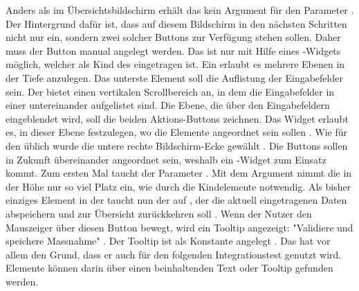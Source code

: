 Anders als im Übersichtsbildschirm erhält das  kein Argument für den Parameter .
Der Hintergrund dafür ist, dass auf diesem Bildschirm in den nächsten Schritten nicht nur ein, sondern zwei solcher Buttons zur Verfügung stehen sollen.
 Daher muss der Button manual angelegt werden.
Das ist nur mit Hilfe eines -Widgets möglich, welcher als Kind des  eingetragen ist.
Ein  erlaubt es mehrere Ebenen in der Tiefe anzulegen.
Das unterste Element soll die Auflistung der Eingabefelder sein.
Der   bietet einen vertikalen Scrollbereich an, in dem die Eingabefelder in einer   untereinander aufgelistet sind.
Die Ebene, die  über den Eingabefeldern eingeblendet wird, soll die beiden Aktions-Buttons zeichnen.
Das Widget  erlaubt es, in dieser Ebene festzulegen, wo die Elemente angeordnet sein sollen .
Wie für den  üblich wurde die untere rechte Bildschirm-Ecke gewählt .
Die Buttons sollen in Zukunft übereinander angeordnet sein, weshalb ein -Widget zum Einsatz kommt.
Zum ersten Mal taucht der Parameter .
Mit dem Argument  nimmt die  in der Höhe nur so viel Platz ein, wie durch die Kindelemente notwendig. Als bisher einziges Element in der   taucht nun der  auf , der die aktuell eingetragenen Daten abspeichern  und zur Übersicht zurückkehren soll . Wenn der Nutzer den Mauszeiger über diesen Button bewegt, wird ein Tooltip angezeigt: "Validiere und speichere Massnahme" . Der Tooltip ist als Konstante angelegt . Das hat vor allem den Grund, dass er auch für den folgenden Integrationstest genutzt wird. Elemente können darin über einen beinhaltenden Text oder Tooltip gefunden werden.



